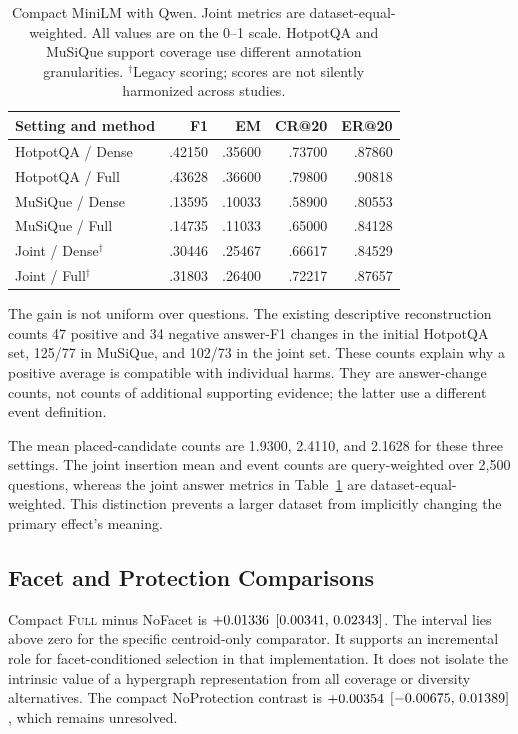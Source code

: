 \documentclass[11pt,a4paper]{article}
\newcommand{\full}{\textsc{Full}\xspace}
\begin{document}
\begin{table}[t]
\centering\small
\begin{tabular}{@{}lrrrr@{}}
\toprule
Setting and method & F1 & EM & CR@20 & ER@20\\
\midrule
HotpotQA / Dense & .42150 & .35600 & .73700 & .87860\\
HotpotQA / Full & .43628 & .36600 & .79800 & .90818\\
MuSiQue / Dense & .13595 & .10033 & .58900 & .80553\\
MuSiQue / Full & .14735 & .11033 & .65000 & .84128\\
Joint / Dense$^\dagger$ & .30446 & .25467 & .66617 & .84529\\
Joint / Full$^\dagger$ & .31803 & .26400 & .72217 & .87657\\
\bottomrule
\end{tabular}
\caption{Compact MiniLM with Qwen. Joint metrics are dataset-equal-weighted.
All values are on the 0--1 scale. HotpotQA and MuSiQue support coverage use
different annotation granularities. $^\dagger$Legacy scoring; scores are
not silently harmonized across studies.}
\label{tab:compact}
\end{table}

The gain is not uniform over questions. The existing descriptive
reconstruction counts 47 positive and 34 negative answer-F1 changes in the
initial HotpotQA set, 125/77 in MuSiQue, and 102/73 in the joint set.
These counts explain why a positive average is compatible with individual
harms. They are answer-change counts, not counts of additional supporting
evidence; the latter use a different event definition.

The mean placed-candidate counts are 1.9300, 2.4110, and 2.1628 for these
three settings. The joint insertion mean and event counts are query-weighted
over 2,500 questions, whereas the joint answer metrics in
Table~\ref{tab:compact} are dataset-equal-weighted.
This distinction prevents a larger dataset from implicitly changing the
primary effect's meaning.

\subsection{Facet and Protection Comparisons}
Compact \full minus NoFacet is $+0.01336$ $[0.00341,\,0.02343]$.
The interval lies above zero for the specific centroid-only comparator.
It supports an incremental role for facet-conditioned selection in that
implementation. It does not isolate the intrinsic value of a hypergraph
representation from all coverage or diversity alternatives.
The compact NoProtection contrast is $+0.00354$ $[-0.00675,\,0.01389]$,
which remains unresolved.
\end{document}

